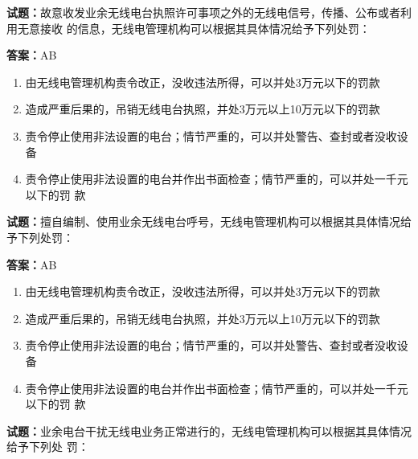 \documentclass{ctexbook}
\begin{document}
\textbf{试题：}故意收发业余无线电台执照许可事项之外的无线电信号，传播、公布或者利用无意接收
的信息，无线电管理机构可以根据其具体情况给予下列处罚： 


\textbf{答案：}AB 

\begin{enumerate}[leftmargin=3em]
  \item 由无线电管理机构责令改正，没收违法所得，可以并处3万元以下的罚款 

  \item 造成严重后果的，吊销无线电台执照，并处3万元以上10万元以下的罚款 

  \item 责令停止使用非法设置的电台；情节严重的，可以并处警告、查封或者没收设备 

  \item 责令停止使用非法设置的电台并作出书面检查；情节严重的，可以并处一千元以下的罚
款 

\end{enumerate}





\vspace{1em}

\textbf{试题：}擅自编制、使用业余无线电台呼号，无线电管理机构可以根据其具体情况给予下列处罚： 

\textbf{答案：}AB 

\begin{enumerate}[leftmargin=3em]
  \item 由无线电管理机构责令改正，没收违法所得，可以并处3万元以下的罚款 

  \item 造成严重后果的，吊销无线电台执照，并处3万元以上10万元以下的罚款 

  \item 责令停止使用非法设置的电台；情节严重的，可以并处警告、查封或者没收设备 

  \item 责令停止使用非法设置的电台并作出书面检查；情节严重的，可以并处一千元以下的罚
款 

\end{enumerate}





\vspace{1em}

\textbf{试题：}业余电台干扰无线电业务正常进行的，无线电管理机构可以根据其具体情况给予下列处
罚： 
\end{document}

